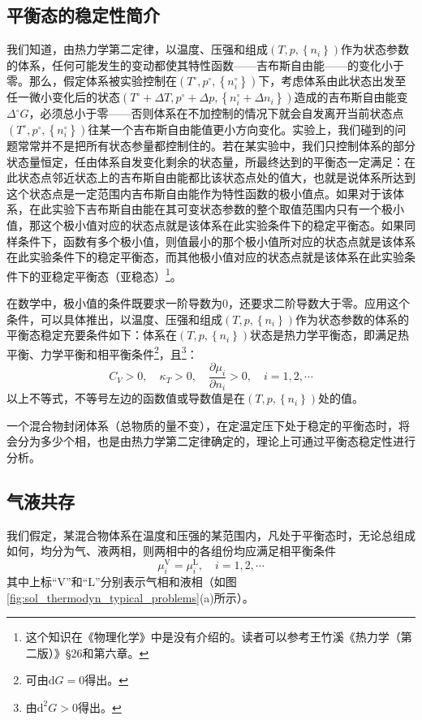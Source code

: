 \documentclass[main.tex]{subfiles}
\begin{document}
\subsection{平衡态的稳定性简介}
我们知道，由热力学第二定律，以温度、压强和组成$\left(T,p,\left\{n_i\right\}\right)$作为状态参数的体系，任何可能发生的变动都使其特性函数——吉布斯自由能——的变化小于零。那么，假定体系被实验控制在$\left(T^\circ,p^\circ,\left\{n_i^\circ\right\}\right)$下，考虑体系由此状态出发至任一微小变化后的状态$\left(T^\circ+\Delta T,p^\circ+\Delta p,\left\{n_i^\circ+\Delta n_i\right\}\right)$造成的吉布斯自由能变$\Delta^\circ G$，必须总小于零——否则体系在不加控制的情况下就会自发离开当前状态点$\left(T^\circ,p^\circ,\left\{n_i^\circ\right\}\right)$往某一个吉布斯自由能值更小方向变化。实验上，我们碰到的问题常常并不是把所有状态参量都控制住的。若在某实验中，我们只控制体系的部分状态量恒定，任由体系自发变化剩余的状态量，所最终达到的平衡态一定满足：在此状态点邻近状态上的吉布斯自由能都比该状态点处的值大，也就是说体系所达到这个状态点是一定范围内吉布斯自由能作为特性函数的极小值点。如果对于该体系，在此实验下吉布斯自由能在其可变状态参数的整个取值范围内只有一个极小值，那这个极小值对应的状态点就是该体系在此实验条件下的稳定平衡态。如果同样条件下，函数有多个极小值，则值最小的那个极小值所对应的状态点就是该体系在此实验条件下的稳定平衡态，而其他极小值对应的状态点就是该体系在此实验条件下的亚稳定平衡态（亚稳态）\footnote{这个知识在《物理化学》中是没有介绍的。读者可以参考王竹溪《热力学（第二版）》\S26和第六章。}。

在数学中，极小值的条件既要求一阶导数为0，还要求二阶导数大于零。应用这个条件，可以具体推出，以温度、压强和组成$\left(T,p,\left\{n_i\right\}\right)$作为状态参数的体系的平衡态稳定充要条件如下：体系在$\left(T,p,\left\{n_i\right\}\right)$状态是热力学平衡态，即满足热平衡、力学平衡和相平衡条件\footnote{可由$\mathrm{d}G=0$得出。}，且\footnote{由$\mathrm{d}^2G>0$得出。}：
\[C_V>0,\quad \kappa_T>0,\quad \frac{\partial \mu_i}{\partial n_i}>0,\quad i=1,2,\cdots\]
以上不等式，不等号左边的函数值或导数值是在$\left(T,p,\left\{n_i\right\}\right)$处的值。

一个混合物封闭体系（总物质的量不变），在定温定压下处于稳定的平衡态时，将会分为多少个相，也是由热力学第二定律确定的，理论上可通过平衡态稳定性进行分析。

\subsection{气液共存}\label{sec:II.5.2 vapor-liquid_equilibrium}
我们假定，某混合物体系在温度和压强的某范围内，凡处于平衡态时，无论总组成如何，均分为气、液两相，则两相中的各组份均应满足相平衡条件
\[\mu_i^\text{V}=\mu_i^\text{L},\quad i=1,2,\cdots\]
其中上标“V”和“L”分别表示气相和液相（如图\ref{fig:sol_thermodyn_typical_problems}(a)所示）。
\end{document}

